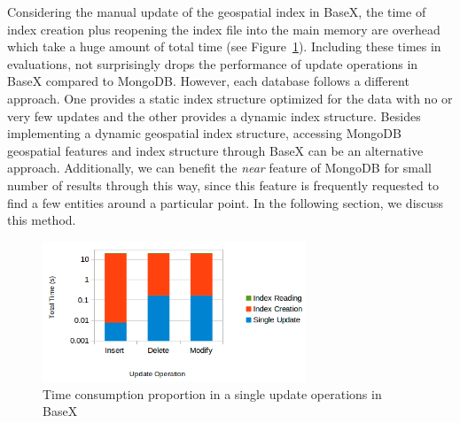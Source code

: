 \documentclass[a4paper,12pt]{article}
\begin{document}
Considering the manual update of the geospatial index in BaseX, %
the time of index creation plus reopening the index file into the main memory are overhead which take a huge amount of total time (see Figure~\ref{figBXUpdate}).
Including these times in evaluations, not surprisingly drops the performance of update operations in BaseX compared to MongoDB. However, each database follows a different approach. One provides a static index structure optimized for the data with no or very few updates and the other provides a dynamic index structure. 
Besides implementing a dynamic geospatial index structure, accessing MongoDB geospatial features and index structure through BaseX can be an alternative approach. Additionally, we can benefit the \textit{near} feature of MongoDB for small number of results through this way, since this feature is frequently requested to find a few entities around a particular point. In the following section, we discuss this method.



\begin{figure}
\centering
\includegraphics[width=0.7\textwidth]{BXUpdate.png}
\caption{Time consumption proportion in a single update operations in BaseX}
\label{figBXUpdate}
\end{figure}
\end{document}

